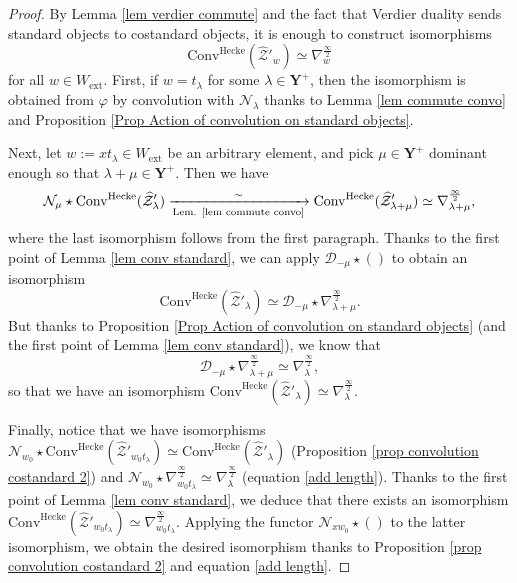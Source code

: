 \documentclass[11pt]{amsart}
\theoremstyle{plain}
\theoremstyle{remark}
\numberwithin{equation}{section}
\begin{document}
\begin{proof}
    By Lemma \ref{lem verdier commute} and the fact that Verdier duality sends standard objects to costandard objects, it is enough to construct isomorphisms
\begin{equation*}\label{eq costandard}
    \mathrm{Conv}^{\mathrm{Hecke}}(\widehat{\mathcal{Z}}'_w)\simeq \nabla^{\frac{\infty}{2}}_{w}
\end{equation*}
for all $w\in W_{\mathrm{ext}}$. First, if $w=t_\lambda$ for some $\lambda\in \mathbf{Y}^+$, then the isomorphism is obtained from $\varphi$ by convolution with $\mathcal{N}_\lambda$ thanks to Lemma \ref{lem commute convo} and Proposition \ref{Prop Action of convolution on standard objects}.

Next, let $w:=xt_\lambda\in W_\mathrm{ext}$ be an arbitrary element, and pick $\mu\in\mathbf{Y}^+$ dominant enough so that $\lambda+\mu\in\mathbf{Y}^+$. Then we have
$$\mathcal{N}_\mu\star \mathrm{Conv}^{\mathrm{Hecke}}(\widehat{\mathcal{Z}}'_\lambda)\xrightarrow[\text{Lem. \ref{lem commute convo}}]{\sim}\mathrm{Conv}^{\mathrm{Hecke}}(\widehat{\mathcal{Z}}'_{\lambda+\mu})\simeq  \nabla^{\frac{\infty}{2}}_{\lambda+\mu},$$
where the last isomorphism follows from the first paragraph. Thanks to the first point of Lemma \ref{lem conv standard}, we can apply $\mathcal{D}_{-\mu}\star ()$ to obtain an isomorphism 
$$ \mathrm{Conv}^{\mathrm{Hecke}}(\widehat{\mathcal{Z}}'_\lambda)\simeq \mathcal{D}_{-\mu}\star \nabla^{\frac{\infty}{2}}_{\lambda+\mu}.$$
But thanks to Proposition \ref{Prop Action of convolution on standard objects} (and the first point of Lemma \ref{lem conv standard}), we know that 
$$\mathcal{D}_{-\mu}\star \nabla^{\frac{\infty}{2}}_{\lambda+\mu}\simeq  \nabla^{\frac{\infty}{2}}_{\lambda},$$
so that we have an isomorphism $\mathrm{Conv}^{\mathrm{Hecke}}(\widehat{\mathcal{Z}}'_\lambda)\simeq  \nabla^{\frac{\infty}{2}}_{\lambda}$.

Finally, notice that we have isomorphisms $\mathcal{N}_{w_0}\star\mathrm{Conv}^{\mathrm{Hecke}}(\widehat{\mathcal{Z}}'_{w_0t_\lambda})\simeq \mathrm{Conv}^{\mathrm{Hecke}}(\widehat{\mathcal{Z}}'_\lambda)$ (Proposition \ref{prop convolution costandard 2}) and $\mathcal{N}_{w_0}\star \nabla^{\frac{\infty}{2}}_{w_0t_\lambda}\simeq \nabla^{\frac{\infty}{2}}_{\lambda}$ (equation \eqref{add length}). Thanks to the first point of Lemma \ref{lem conv standard}, we deduce that there exists an isomorphism $\mathrm{Conv}^{\mathrm{Hecke}}(\widehat{\mathcal{Z}}'_{w_0t_\lambda})\simeq  \nabla^{\frac{\infty}{2}}_{w_0t_\lambda}$. Applying the functor $\mathcal{N}_{xw_0}\star()$ to the latter isomorphism, we obtain the desired isomorphism thanks to Proposition \ref{prop convolution costandard 2} and equation \eqref{add length}.
\end{proof}
\end{document}
